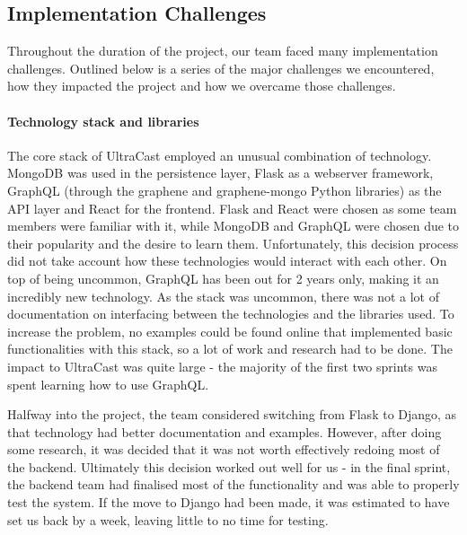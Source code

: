 \documentclass[../report.tex]{subfiles}
\begin{document}
\subsection{Implementation Challenges} \label{ssec:backend_challenges}


Throughout the duration of the project, our team faced many implementation challenges.
Outlined below is a series of the major challenges we encountered, how they impacted the project and how we overcame those challenges.

\paragraph{Technology stack and libraries}

The core stack of UltraCast employed an unusual combination of technology.
MongoDB was used in the persistence layer, Flask as a webserver framework, GraphQL (through the graphene and graphene-mongo Python libraries) as the API layer and React for the frontend.
Flask and React were chosen as some team members were familiar with it, while MongoDB and GraphQL were chosen due to their popularity and the desire to learn them.
Unfortunately, this decision process did not take account how these technologies would interact with each other.
On top of being uncommon, GraphQL has been out for 2 years only, making it an incredibly new technology.
As the stack was uncommon, there was not a lot of documentation on interfacing between the technologies and the libraries used.
To increase the problem, no examples could be found online that implemented basic functionalities with this stack, so a lot of work and research had to be done.
The impact to UltraCast was quite large - the majority of the first two sprints was spent learning how to use GraphQL.

Halfway into the project, the team considered switching from Flask to Django, as that technology had better documentation and examples.
However, after doing some research, it was decided that it was not worth effectively redoing most of the backend.
Ultimately this decision worked out well for us - in the final sprint, the backend team had finalised most of the functionality and was able to properly test the system.
If the move to Django had been made, it was estimated to have set us back by a week, leaving little to no time for testing.
\end{document}
